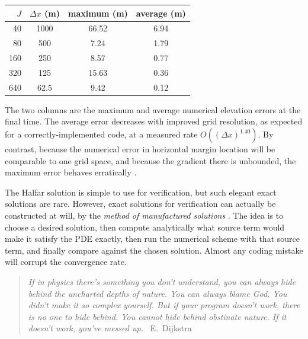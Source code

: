 \documentclass[letterpaper,final,12pt,reqno]{amsart}
\begin{document}
\smallskip
\begin{center}
\begin{tabular}{r|c|c|c}
$J$ & $\Delta x$ (m) & maximum (m) & average (m) \\ \hline
40 & 1000 & 66.52 & 6.94 \\
80 & 500 & 7.24 & 1.79 \\
160 & 250 & 8.57 & 0.77 \\
320 & 125 & 15.63 & 0.36 \\
640 & 62.5 & 9.42 & 0.12
\end{tabular}
\end{center}

\smallskip
The two columns are the maximum and average numerical elevation errors at the final time.  The average error decreases with improved grid resolution, as expected for a correctly-implemented code, at a measured rate $O((\Delta x)^{1.40})$.  By contrast, because the numerical error in horizontal margin location will be comparable to one grid space, and because the gradient there is unbounded, the maximum error behaves erratically \cite{Bueleretal2005}.

The Halfar solution is simple to use for verification, but such elegant exact solutions are rare.  However, exact solutions for verification can actually be constructed at will, by the \emph{method of manufactured solutions} \cite{Wesseling2001}.  The idea is to choose a desired solution, then compute analytically what source term would make it satisfy the PDE exactly, then run the numerical scheme with that source term, and finally compare against the chosen solution.  Almost any coding mistake will corrupt the convergence rate.

\bigskip
\begin{quotation}
\emph{If in physics there's something you don't understand, you can always hide behind the uncharted depths of nature. You can always blame God. You didn't make it so complex yourself. But if your program doesn't work, there is no one to hide behind. You cannot hide behind obstinate nature. If it doesn't work, you've messed up.} \,  E.~Dijkstra
\end{quotation}


\bigskip
\footnotesize



\end{document}
